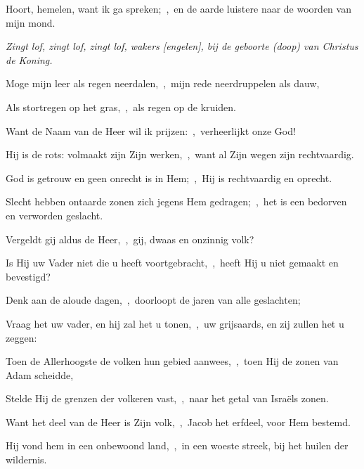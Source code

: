 \documentclass[12pt,twoside,a5paper]{article}
\begin{document}



\begin{halfparskip}
  Hoort, hemelen, want ik ga spreken;~\sep\ en de aarde luistere naar de woorden van mijn mond.


   \emph{Zingt lof, zingt lof, zingt lof, wakers [engelen], bij de geboorte (doop) van Christus de Koning.}

  Moge mijn leer als regen neerdalen,~\sep\ mijn rede neerdruppelen als dauw,

  Als stortregen op het gras,~\sep\ als regen op de kruiden.

  Want de Naam van de Heer wil ik prijzen:~\sep\ verheerlijkt onze God!

  Hij is de rots: volmaakt zijn Zijn werken,~\sep\ want al Zijn wegen zijn rechtvaardig.

  God is getrouw en geen onrecht is in Hem;~\sep\ Hij is rechtvaardig en oprecht.

  Slecht hebben ontaarde zonen zich jegens Hem gedragen;~\sep\ het is een bedorven en verworden geslacht.

  Vergeldt gij aldus de Heer,~\sep\ gij, dwaas en onzinnig volk?

  Is Hij uw Vader niet die u heeft voortgebracht,~\sep\ heeft Hij u niet gemaakt en bevestigd?

  Denk aan de aloude dagen,~\sep\ doorloopt de jaren van alle geslachten;

  Vraag het uw vader, en hij zal het u tonen,~\sep\ uw grijsaards, en zij zullen het u zeggen:

  Toen de Allerhoogste de volken hun gebied aanwees,~\sep\ toen Hij de zonen van Adam scheidde,

  Stelde Hij de grenzen der volkeren vast,~\sep\ naar het getal van Israëls zonen.

  Want het deel van de Heer is Zijn volk,~\sep\ Jacob het erfdeel, voor Hem bestemd.

  Hij vond hem in een onbewoond land,~\sep\ in een woeste streek, bij het huilen der wildernis.


\end{halfparskip}
\end{document}
